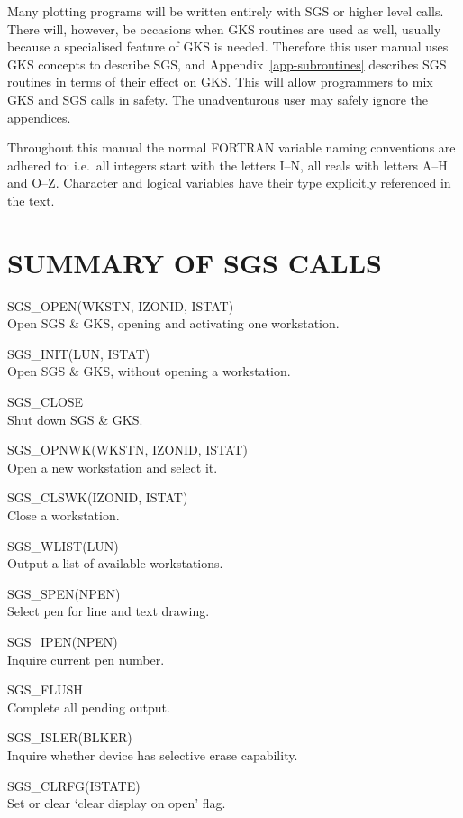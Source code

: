 \documentclass[11pt]{article}
\newcommand{\hyperref}[4]{#2\ref{#4}#3}
\newcommand{\htmlref}[2]{#1}
\newcommand{\routinehead}[1]{\vspace{\bigskipamount}{\large\bf#1}}
\newenvironment{routinelist}{\begin{list}{}{\setlength{\leftmargin}{2cm}
                             \setlength{\parsep}{\smallskipamount}}}{\end{list}}
\newcommand{\routine}[2]{\item\hspace{-1cm}#1#2\\}
\newcommand{\routinehead}[1]{\subsection{#1}}
\newcommand{\routine}[2]{\item \htmlref{#1}{#1}#2\\}
\begin{document}
Many plotting programs will be written entirely with SGS or higher level calls.
There will, however, be occasions when GKS routines are used as well, usually
because a specialised feature of GKS is needed. Therefore this user manual uses
GKS concepts to describe SGS, and
\hyperref{this appendix}{Appendix~}{}{app-subroutines} describes SGS
routines in terms of their effect on GKS. This will allow programmers to mix
GKS and SGS calls in safety. The unadventurous user may safely ignore the
appendices.

Throughout this manual the normal FORTRAN variable naming conventions are
adhered to:  i.e.\ all integers start with the letters I--N, all reals with
letters A--H and O--Z. Character and logical variables have their type
explicitly referenced in the text.


\section{SUMMARY OF SGS CALLS}\label{sec-summary}

\routinehead{Control}
\begin{routinelist}
\routine {SGS\_OPEN}{(WKSTN, IZONID, ISTAT)}
   Open SGS \& GKS, opening and activating one workstation.
\routine {SGS\_INIT}{(LUN, ISTAT)}
   Open SGS \& GKS, without opening a workstation.
\routine {SGS\_CLOSE}{}
   Shut down SGS \& GKS.
\routine {SGS\_OPNWK}{(WKSTN, IZONID, ISTAT)}
   Open a new workstation and select it.
\routine {SGS\_CLSWK}{(IZONID, ISTAT)}
   Close a workstation.
\routine {SGS\_WLIST}{(LUN)}
   Output a list of available workstations.
\routine {SGS\_SPEN}{(NPEN)}
   Select pen for line and text drawing.
\routine {SGS\_IPEN}{(NPEN)}
   Inquire current pen number.
\routine {SGS\_FLUSH}{}
   Complete all pending output.
\routine {SGS\_ISLER}{(BLKER)}
   Inquire whether device has selective erase capability.
\routine {SGS\_CLRFG}{(ISTATE)}
   Set or clear `clear display on open' flag.
\end{routinelist}
\end{document}
